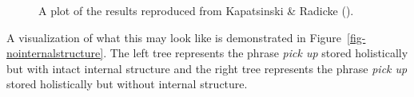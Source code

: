 \documentclass[
  12pt,
  letterpaper,
]{scrreprt}
\begin{document}
\begin{figure}[htbp]

\caption{\label{fig-kapatsinskiplot}A plot of the results reproduced
from Kapatsinski \& Radicke
().}


\end{figure}%

A visualization of what this may look like is demonstrated in
Figure~\ref{fig-nointernalstructure}. The left tree represents the
phrase \emph{pick up} stored holistically but with intact internal
structure and the right tree represents the phrase \emph{pick up} stored
holistically but without internal structure.
\end{document}
